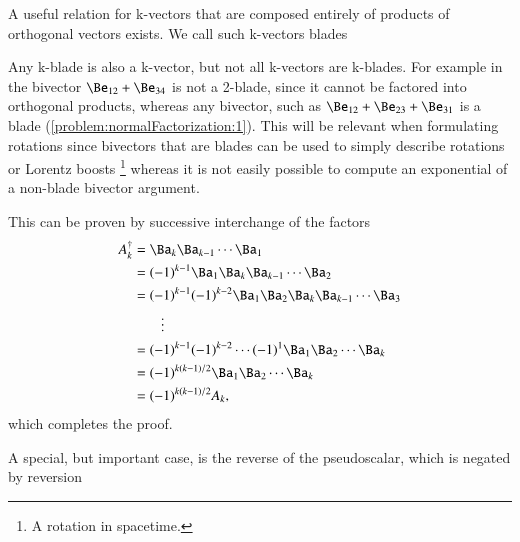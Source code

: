%
%


A useful relation for k-vectors that are composed entirely of products of orthogonal vectors exists.  We call such k-vectors blades


Any k-blade is also a k-vector, but not all k-vectors are k-blades.  For example in  the bivector
\(
\Be_{12} + \Be_{34} \)
is not a 2-blade, since it cannot be factored into orthogonal products, whereas any  bivector, such as
\( \Be_{12} + \Be_{23} + \Be_{31} \) is a blade (\cref{problem:normalFactorization:1}).
This will be relevant when formulating rotations since bivectors that are blades can be used to simply describe rotations or Lorentz boosts
\footnote{A rotation in spacetime.} whereas it is not easily possible to compute an exponential of a non-blade bivector argument.


This can be proven by successive interchange of the factors
\begin{dmath}\label{eqn:reverse:81}
\begin{aligned}
A_k^\dagger
&= \Ba_k \Ba_{k-1} \cdots \Ba_1 \\
&= (-1)^{k-1} \Ba_1 \Ba_k \Ba_{k-1} \cdots \Ba_2 \\
&= (-1)^{k-1} (-1)^{k-2} \Ba_1 \Ba_2 \Ba_k \Ba_{k-1} \cdots \Ba_3 \\
&\qquad \vdots \\
&= (-1)^{k-1} (-1)^{k-2} \cdots (-1)^1 \Ba_1 \Ba_2 \cdots \Ba_k \\
&= (-1)^{k(k-1)/2} \Ba_1 \Ba_2 \cdots \Ba_k \\
&= (-1)^{k(k-1)/2} A_k,
\end{aligned}
\end{dmath}
which completes the proof.

A special, but important case, is the reverse of the  pseudoscalar, which is negated by reversion

